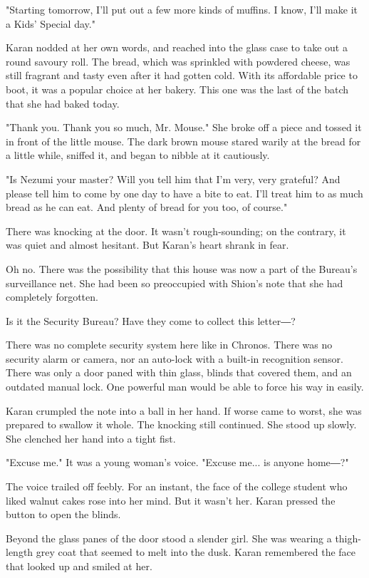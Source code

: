 "Starting tomorrow, I'll put out a few more kinds of muffins. I know,
I'll make it a Kids' Special day."

Karan nodded at her own words, and reached into the glass case to take
out a round savoury roll. The bread, which was sprinkled with powdered
cheese, was still fragrant and tasty even after it had gotten cold. With
its affordable price to boot, it was a popular choice at her bakery.
This one was the last of the batch that she had baked today.

"Thank you. Thank you so much, Mr. Mouse." She broke off a piece and
tossed it in front of the little mouse. The dark brown mouse stared
warily at the bread for a little while, sniffed it, and began to nibble
at it cautiously.

"Is Nezumi your master? Will you tell him that I'm very, very grateful?
And please tell him to come by one day to have a bite to eat. I'll treat
him to as much bread as he can eat. And plenty of bread for you too, of
course."

There was knocking at the door. It wasn't rough-sounding; on the
contrary, it was quiet and almost hesitant. But Karan's heart shrank in
fear.

Oh no. There was the possibility that this house was now a part of the
Bureau's surveillance net. She had been so preoccupied with Shion's note
that she had completely forgotten.

Is it the Security Bureau? Have they come to collect this letter―?

There was no complete security system here like in Chronos. There was no
security alarm or camera, nor an auto-lock with a built-in recognition
sensor. There was only a door paned with thin glass, blinds that covered
them, and an outdated manual lock. One powerful man would be able to
force his way in easily.

Karan crumpled the note into a ball in her hand. If worse came to worst,
she was prepared to swallow it whole. The knocking still continued. She
stood up slowly. She clenched her hand into a tight fist.

"Excuse me." It was a young woman's voice. "Excuse me... is anyone
home―?"

The voice trailed off feebly. For an instant, the face of the college
student who liked walnut cakes rose into her mind. But it wasn't her.
Karan pressed the button to open the blinds.

Beyond the glass panes of the door stood a slender girl. She was wearing
a thigh-length grey coat that seemed to melt into the dusk. Karan
remembered the face that looked up and smiled at her.

